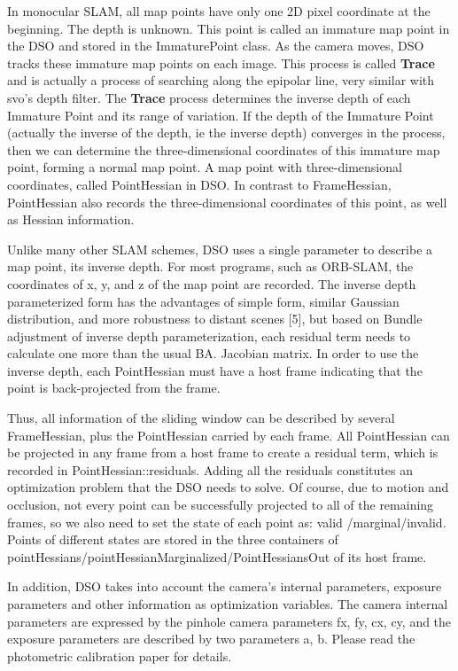 \documentclass[a4paper,10pt]{article}
\begin{document}
	In monocular SLAM, all map points have only one 2D pixel coordinate at the beginning.  The depth is unknown. This point is called an immature map point in the DSO and stored in the ImmaturePoint class. As the camera moves, DSO tracks these immature map points on each image. This process is called \textbf{Trace} and is actually a process of searching along the epipolar line, very similar with svo's depth filter. The \textbf{Trace} process determines the inverse depth of each Immature Point and its range of variation. If the depth of the Immature Point (actually the inverse of the depth, ie the inverse depth) converges in the process, then we can determine the three-dimensional coordinates of this immature map point, forming a normal map point. A map point with three-dimensional coordinates, called PointHessian in DSO. In contrast to FrameHessian, PointHessian also records the three-dimensional coordinates of this point, as well as Hessian information.
	
	Unlike many other SLAM schemes, DSO uses a single parameter to describe a map point, its inverse depth. For most programs, such as ORB-SLAM, the coordinates of x, y, and z of the map point are recorded. The inverse depth parameterized form has the advantages of simple form, similar Gaussian distribution, and more robustness to distant scenes [5], but based on Bundle adjustment of inverse depth parameterization, each residual term needs to calculate one more than the usual BA. Jacobian matrix. In order to use the inverse depth, each PointHessian must have a host frame indicating that the point is back-projected from the frame.
	
	Thus, all information of the sliding window can be described by several FrameHessian, plus the PointHessian carried by each frame. All PointHessian can be projected in any frame from a host frame to create a residual term, which is recorded in PointHessian::residuals. Adding all the residuals constitutes an optimization problem that the DSO needs to solve. Of course, due to motion and occlusion, not every point can be successfully projected to all of the remaining frames, so we also need to set the state of each point as: valid /marginal/invalid. Points of different states are stored in the three containers of pointHessians/pointHessianMarginalized/PointHessiansOut of its host frame.
	
	In addition, DSO takes into account the camera's internal parameters, exposure parameters and other information as optimization variables. The camera internal parameters are expressed by the pinhole camera parameters fx, fy, cx, cy, and the exposure parameters are described by two parameters a, b. Please read the photometric calibration paper for details.
	
\end{document}
